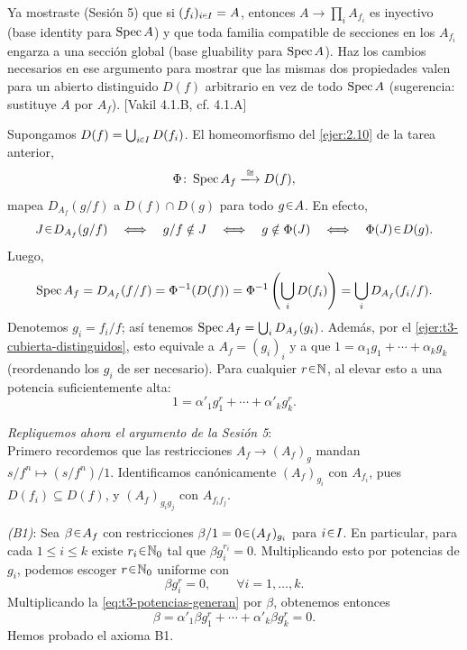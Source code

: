 \begin{ejer}\label{ejer:t3-pegado-distinguidos}
Ya mostraste (Sesión 5) que si $(f_i)_{i\en I}=A$, entonces $A\to\prod_i A_{f_i}$ es inyectivo (base identity para $\operatorname{Spec} A$) y que toda familia compatible de secciones en los $A_{f_i}$ engarza a una sección global (base gluability para $\operatorname{Spec} A$). Haz los cambios necesarios en ese argumento para mostrar que las mismas dos propiedades valen para un abierto distinguido $D(f)$ arbitrario en vez de todo $\operatorname{Spec} A$ (sugerencia: sustituye $A$ por $A_f$). \hfill [Vakil 4.1.B, cf. 4.1.A]
\end{ejer}
\begin{sol}
Supongamos $D(f)=\bigcup_{i\en I}D(f_i)$. El homeomorfismo del \cref{ejer:2.10} de la tarea anterior,
\[
\Phi\colon\Spec A_f\xlongrightarrow{\cong}D(f),
\]
mapea $D_{A_f}(g/f)$ a $D(f)\cap D(g)$ para todo $g\en A$. En efecto,
\[
J\en D_{A_f}(g/f)
\quad\Longleftrightarrow\quad g/f\notin J
\quad\Longleftrightarrow\quad g\notin\Phi(J)
\quad\Longleftrightarrow\quad\Phi(J)\en D(g).
\]
Luego,
\[
\operatorname{Spec} A_f=D_{A_f}(f/f)=\Phi^{-1}(D(f))
=\Phi^{-1}\left(\bigcup_iD(f_i)\right)=\bigcup_iD_{A_f}(f_i/f).
\]
Denotemos $g_i=f_i/f$; así tenemos $\operatorname{Spec} A_f=\bigcup_iD_{A_f}(g_i)$. Además, por el \cref{ejer:t3-cubierta-distinguidos}, esto equivale a $A_f=(g_i)_i$ y a que $1=\alpha_1g_1+\cdots+\alpha_k g_k$ (reordenando los $g_i$ de ser necesario). Para cualquier $r\en\mathbb N$, al elevar esto a una potencia suficientemente alta:
\begin{equation}\label{eq:t3-potencias-generan}
1=\alpha'_1g_1^r+\cdots+\alpha'_k g_k^r.
\end{equation}

\medskip
\noindent\emph{Repliquemos ahora el argumento de la Sesión 5}:\\
Primero recordemos que las restricciones $A_f\to(A_f)_g$ mandan $s/f^n\mapsto(s/f^n)/1$. Identificamos canónicamente $(A_f)_{g_i}$ con $A_{f_i}$, pues $D(f_i)\subseteq D(f)$, y $(A_f)_{g_i g_j}$ con $A_{f_i f_j}$.

\medskip
\noindent\emph{(B1)}: Sea $\beta\en A_f$ con restricciones $\beta/1=0\en(A_f)_{g_i}$ para $i\en I$. En particular, para cada $1\le i\le k$ existe $r_i\en\mathbb N_0$ tal que $\beta g_i^{r_i}=0$. Multiplicando esto por potencias de $g_i$, podemos escoger $r\en\mathbb N_0$ uniforme con
\[
\beta g_i^r=0,\qquad\forall i=1,\ldots,k.
\]
Multiplicando la \cref{eq:t3-potencias-generan} por $\beta$, obtenemos entonces
\[
\beta=\alpha'_1\beta g_1^r+\cdots+\alpha'_k\beta g_k^r=0.
\]
Hemos probado el axioma B1.


\end{sol}
